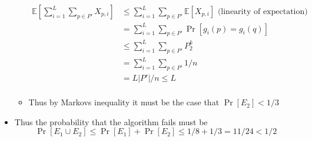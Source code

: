 \begin{itemize}
\begin{itemize}
    \begin{align*}
      \mathbb E[\sum_{i=1}^L \sum_{p \in P'} X_{p,i}] &\leq \sum_{i=1}^L \sum_{p \in P'} \mathbb E[X_{p,i}] 
       \text{ (linearity of expectation)}\\
                                                 &= \sum_{i=1}^L \sum_{p \in P'} \Pr[g_i(p) = g_i(q)] \\
                                                 &\leq \sum_{i=1}^L \sum_{p \in P'} P_2^k \\
                                                 &= \sum_{i=1}^L \sum_{p \in P'} 1/n \\
                                                 &= L|P'|/n \leq L \\
    \end{align*}
    \item Thus by Markovs inequality it must be the case that $\Pr[E_2] < 1/3$
  \end{itemize}
  \item Thus the probability that the algorithm fails must be 
  \[
    \Pr[E_1 \cup E_2] \leq \Pr[E_1] + \Pr[E_2] \leq 1/8 + 1/3 = 11/24 < 1/2
  \]
\end{itemize}

\newpage

